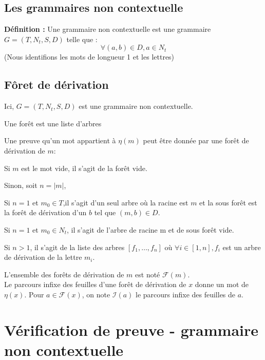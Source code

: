\documentclass[a4paper,12pt]{article}
\newcommand{\norm}[1]{\lvert #1 \rvert}
\newlength{\mydepth}
\newlength{\myheight}
\newenvironment{answer}
{\par\begin{lrbox}{\mybox}\quad\begin{minipage}{\linewidth}\color{black}\setlength{\parskip}{10pt plus 1pt minus 1pt}\vspace*{-.7\baselineskip}}
{\end{minipage}\end{lrbox}
\settodepth{\mydepth}{\usebox{\mybox}}
\settoheight{\myheight}{\usebox{\mybox}}
\addtolength{\myheight}{\mydepth}
\noindent\makebox[0pt]{
  \color{gray}\hspace{-0pt}\rule[-\mydepth]{1pt}{\myheight}}
  \usebox{\mybox}
  }
\begin{document}
\subsection{Les grammaires non contextuelle}

\textbf{  Définition : } Une grammaire non contextuelle est une grammaire $G = (T,N_t,S,D)$ telle que :
\begin{equation*} \forall (a,b) \in D, a \in N_t  \end{equation*}
(Nous identifions les mots de longueur 1 et les lettres)




\subsection{Fôret de dérivation}

Ici, $G = (T,N_t,S,D)$ est une grammaire non contextuelle.

Une forêt est une liste d'arbres


Une preuve qu'un mot appartient à $\eta(m)$ peut être donnée par une forêt de dérivation de $m$:

\begin{answer} 
Si $m$ est le mot vide, il s'agit de la forêt vide.

Sinon, soit $n = \norm{m}$,\\
\begin{answer} 
    Si $n=1$ et $m_0 \in T$,il s'agit d'un seul arbre où la racine est $m$ et la sous forêt est la forêt de dérivation d'un $b$ tel que $(m,b) \in D$.

    Si $n=1$ et $m_0 \in N_t$, il s'agit de l'arbre de racine m et de sous forêt vide.

    Si $n>1$, il s'agit de la liste des arbres $[f_1, \dots, f_n]$ où $\forall i \in [1,n], f_i$ est un arbre de dérivation de la lettre $m_i$.
\end{answer}
\end{answer}

L'ensemble des forêts de dérivation de $m$ est noté $\mathcal{F}(m)$.\\
Le parcours infixe des feuilles d'une forêt de dérivation de $x$ donne un mot de $\eta(x)$.
Pour $a \in \mathcal{F}(x)$, on note $\mathcal{I}(a)$ le parcours infixe des feuilles de $a$. 










\section{Vérification de preuve - grammaire non contextuelle}
\end{document}
